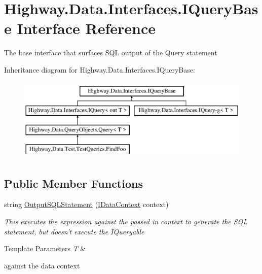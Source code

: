 \hypertarget{interface_highway_1_1_data_1_1_interfaces_1_1_i_query_base}{\section{Highway.\-Data.\-Interfaces.\-I\-Query\-Base Interface Reference}
\label{interface_highway_1_1_data_1_1_interfaces_1_1_i_query_base}
}


The base interface that surfaces S\-Q\-L output of the Query statement  


Inheritance diagram for Highway.\-Data.\-Interfaces.\-I\-Query\-Base\-:\begin{figure}[H]
\begin{center}
\leavevmode
\includegraphics[height=4.000000cm]{interface_highway_1_1_data_1_1_interfaces_1_1_i_query_base}
\end{center}
\end{figure}
\subsection*{Public Member Functions}
\begin{DoxyCompactItemize}
\item 
string \hyperlink{interface_highway_1_1_data_1_1_interfaces_1_1_i_query_base_a151df3073faaf51d98207e2794f62817}{Output\-S\-Q\-L\-Statement} (\hyperlink{interface_highway_1_1_data_1_1_interfaces_1_1_i_data_context}{I\-Data\-Context} context)
\begin{DoxyCompactList}\small\item\em This executes the expression against the passed in context to generate the S\-Q\-L statement, but doesn't execute the I\-Queryable
\begin{DoxyTemplParams}{Template Parameters}
{\em T} & \\
\hline
\end{DoxyTemplParams}
against the data context \end{DoxyCompactList}\end{DoxyCompactItemize}


